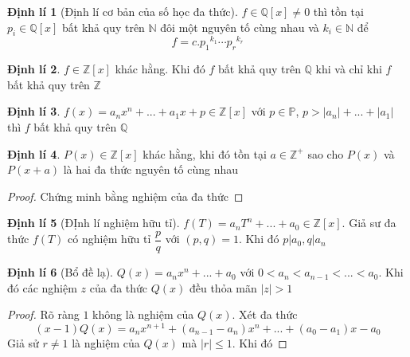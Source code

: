 \documentclass[12pt,a4paper]{article}
\theoremstyle{definition}
\newtheorem{theorem}{Định lí}[section]
\theoremstyle{remark}
\begin{document}
\begin{theorem}[Định lí cơ bản của số học đa thức]
  $f\in \mathbb{Q}[x]\neq 0$ thì tồn tại $p_i \in \mathbb{Q}[x]$ bất khả quy trên $\mathbb{N}$ đôi một nguyên tố cùng nhau và $k_i\in \mathbb{N}$ để $$f=c.{p_1}^{k_1} \cdots {p_r}^{k_r}$$
\end{theorem}
\begin{theorem}
$f\in \mathbb{Z}[x]$ khác hằng. Khi đó $f$ bất khả quy trên $\mathbb{Q}$ khi và chỉ khi $f$ bất khả quy trên $\mathbb{Z}$
\end{theorem}
\begin{theorem}
$f(x)=a_nx^n+...+a_1x+p \in \mathbb{Z}[x]$ với $p\in \mathbb{P}$, $p>|a_n|+...+|a_1|$ thì $f$ bất khả quy trên $\mathbb{Q}$
\end{theorem}
\begin{theorem}
$P(x)\in \mathbb{Z}[x]$ khác hằng, khi đó tồn tại $a\in \mathbb{Z}^+$ sao cho $P(x)$ và $P(x+a)$ là hai đa thức nguyên tố cùng nhau
\end{theorem}
\begin{proof}
Chứng minh bằng nghiệm của đa thức
\end{proof}
\begin{theorem}[ĐỊnh lí nghiệm hữu tỉ]
$f(T)=a_nT^n+...+a_0 \in \mathbb{Z}[x]$. Giả sư đa thức $f(T)$ có nghiệm hữu tỉ $\dfrac{p}{q}$ với $(p,q)=1$. Khi đó $p|a_0, q|a_n$
\end{theorem}
\begin{theorem}[Bổ đề lạ]
$Q(x)=a_nx^n+...+a_0$ với $0<a_n<a_{n-1}<...<a_0$. Khi đó các nghiệm $z$ của đa thức $Q(x)$ đều thỏa mãn $|z|>1$
\end{theorem}
\begin{proof}
Rõ ràng $1$ không là nghiệm của $Q(x)$. Xét đa thức $$(x-1)Q(x)=a_nx^{n+1}+(a_{n-1}-a_n)x^n+...+(a_0-a_1)x-a_0$$
Giả sử $r\neq 1$ là nghiệm của $Q(x)$ mà $|r|\leq 1$. Khi đó
\end{proof}
\end{document}
